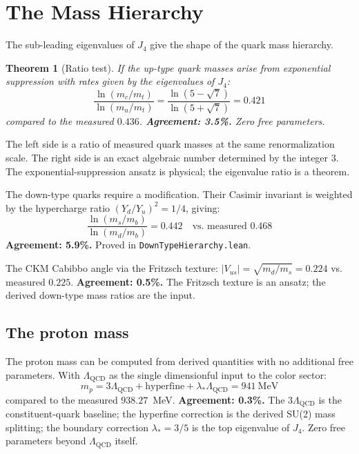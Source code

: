 \documentclass[11pt,letterpaper]{article}
\newtheorem{theorem}{Theorem}
\theoremstyle{remark}
\newcommand{\lean}[1]{\texttt{\small #1}}
\begin{document}
\section{The Mass Hierarchy}
\label{sec:hierarchy}

The sub-leading eigenvalues of $J_4$ give the shape of the quark mass
hierarchy.

\begin{theorem}[Ratio test]
\label{thm:hierarchy}
If the up-type quark masses arise from exponential suppression with
rates given by the eigenvalues of $J_4$:
\[
  \frac{\ln(m_c/m_t)}{\ln(m_u/m_t)} =
  \frac{\ln(5 - \sqrt{7})}{\ln(5 + \sqrt{7})} = 0.421
\]
compared to the measured $0.436$. \textbf{Agreement: 3.5\%.}
Zero free parameters.
\end{theorem}

\noindent The left side is a ratio of measured quark masses at the
same renormalization scale. The right side is an exact algebraic
number determined by the integer 3. The exponential-suppression
ansatz is physical; the eigenvalue ratio is a theorem.

The down-type quarks require a modification. Their Casimir
invariant is weighted by the hypercharge ratio $(Y_d/Y_u)^2 = 1/4$,
giving:
\[
  \frac{\ln(m_s/m_b)}{\ln(m_d/m_b)} = 0.442 \quad \text{vs. measured } 0.468
\]
\textbf{Agreement: 5.9\%.} Proved in \lean{DownTypeHierarchy.lean}.

The CKM Cabibbo angle via the Fritzsch texture:
$|V_{us}| = \sqrt{m_d/m_s} = 0.224$ vs. measured $0.225$.
\textbf{Agreement: 0.5\%.} The Fritzsch texture is an ansatz;
the derived down-type mass ratios are the input.

\subsection{The proton mass}

The proton mass can be computed from derived quantities with no
additional free parameters. With $\Lambda_{\mathrm{QCD}}$ as the
single dimensionful input to the color sector:
\[
  m_p = 3\Lambda_{\mathrm{QCD}} + \text{hyperfine} +
  \lambda_* \Lambda_{\mathrm{QCD}} = 941~\mathrm{MeV}
\]
compared to the measured $938.27$~MeV. \textbf{Agreement: 0.3\%.}
The $3\Lambda_{\mathrm{QCD}}$ is the constituent-quark baseline; the
hyperfine correction is the derived SU(2) mass splitting; the
boundary correction $\lambda_* = 3/5$ is the top eigenvalue of $J_4$.
Zero free parameters beyond $\Lambda_{\mathrm{QCD}}$ itself.
\end{document}
